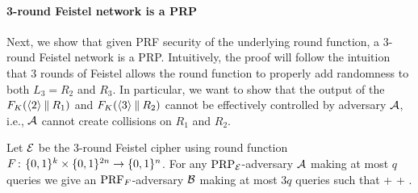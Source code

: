 \paragraph{3-round Feistel network is a PRP}
Next, we show that given PRF security of the underlying round function, a 3-round Feistel network is a PRP.
Intuitively, the proof will follow the intuition that 3 rounds of Feistel allows the round function to properly add randomness to both $L_3 = R_2$ and $R_3$.
In particular, we want to show that the output of the $F_{K}(\langle 2 \rangle\: \| \: R_1)$ and $F_{K}(\langle 3 \rangle\: \| \: R_2)$ cannot be effectively controlled by adversary ${\mathcal A}$, i.e., ${\mathcal A}$ cannot create collisions on $R_1$ and $R_2$.

\begin{theorem}\label{thm:luby-rackoff}
Let ${\cal E}$ be the 3-round Feistel cipher using round function
$F{{\kern .05em}\colon{\kern .05em}}\{0,1\}^k\times\{0,1\}^{2n}\rightarrow \{0,1\}^n$. For any
$\textnormal{PRP}_{\cal E}$-adversary ${\mathcal A}$ making at most $q$ queries
we give an $\textnormal{PRF}_{F}$-adversary ${\mathcal B}$ making at most $3q$ queries such that
\bnm
  \AdvPRP{\Feistel}{\advA} \le \AdvPRF{\prf}{\advB} +  +
   \;.
\enm
\end{theorem}

